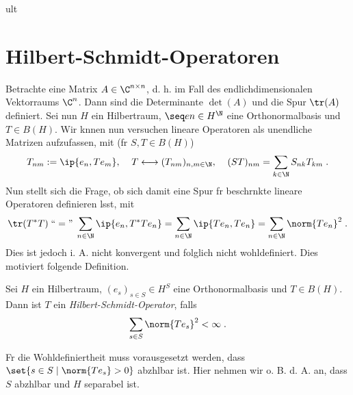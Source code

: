 ult\section{Hilbert-Schmidt-Operatoren}

\begin{rem}[Motivation]
	Betrachte eine Matrix \(A\in \C^{n\times n}\), d. h. im Fall des endlichdimensionalen Vektorraums \(\C^n\). Dann sind die Determinante \(\det(A)\) und die Spur \(\tr(A)\) definiert. Sei nun \(H\) ein Hilbertraum, \(\seq en \in H^\N\) eine Orthonormalbasis und \(T\in B(H)\). Wir k\os nnen nun versuchen lineare Operatoren als unendliche Matrizen aufzufassen, mit (f\us r \(S,T\in B(H)\))
	\[T_{nm} := \ip{e_n, Te_m},\;\;\;\; T \longleftrightarrow (T_{nm})_{n,m\in\N},\;\;\;\; (ST)_{nm} = \sum_{k\in\N} S_{nk}T_{km}\;.\]
	Nun stellt sich die Frage, ob sich damit eine Spur f\us r beschr\as nkte lineare Operatoren definieren l\as sst, mit 
	\[\tr(T^*T) \;``= "\; \sum_{n\in\N} \ip{e_n, T^*T e_n} = \sum_{n\in\N}\ip{T e_n, T e_n} = \sum_{n\in\N} \norm{T e_n}^2\;. \]
	Dies ist jedoch i. A. nicht konvergent und folglich nicht wohldefiniert. Dies motiviert folgende Definition.
\end{rem}

\begin{definition}
	Sei \(H\) ein Hilbertraum, \((e_s)_{s\in S}\in H^S\) eine Orthonormalbasis und \(T\in B(H)\). Dann ist \(T\) ein \textit{Hilbert-Schmidt-Operator}, falls 
	\[\sum_{s\in S} \norm{T e_s}^2 < \infty\;.\] 
\end{definition}
\begin{rem}
	F\us r die Wohldefiniertheit muss vorausgesetzt werden, dass \(\set{s\in S \;\vert\; \norm{Te_s} > 0}\) abz\as hlbar ist. Hier nehmen wir o. B. d. A. an, dass $S$ abz\as hlbar und $H$ separabel ist. 
\end{rem}

